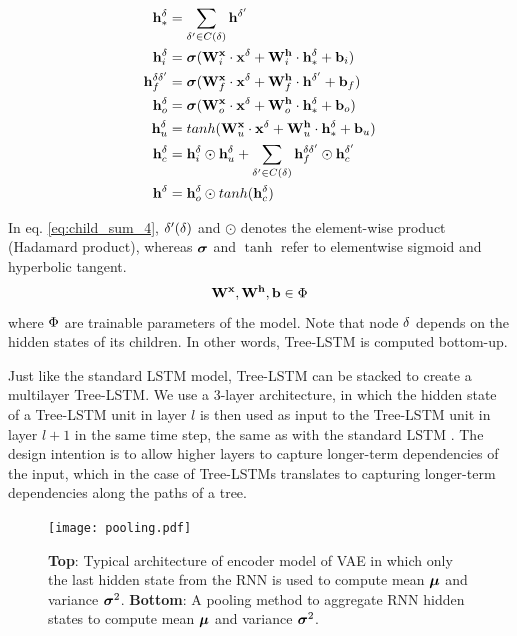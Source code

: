 \begin{align}\label{eq:tree_lstm_encoder}
    \mathbf{h}^\delta_{*} &= \sum_{\delta' \in C(\delta)} \mathbf{h}^{\delta'} \\
    \mathbf{h}_i^\delta &= \boldsymbol\sigma(\mathbf{W}^{\mathbf{x}}_{i} \cdot \mathbf{x}^\delta + \mathbf{W}^{\mathbf{h}}_{i} \cdot \mathbf{h}^\delta_* + \mathbf{b}_{i})  \\ 
    \mathbf{h}_f^{\delta \delta'} &= \boldsymbol\sigma(\mathbf{W}^{\mathbf{x}}_{f} \cdot \mathbf{x}^\delta + \mathbf{W}^{\mathbf{h}}_{f} \cdot \mathbf{h}^{\delta'} + \mathbf{b}_{f}) \\\label{eq:child_sum_4}
    \mathbf{h}_o^\delta &= \boldsymbol\sigma(\mathbf{W}^{\mathbf{x}}_{o} \cdot \mathbf{x}^\delta + \mathbf{W}^{\mathbf{h}}_{o} \cdot \mathbf{h}^\delta_* + \mathbf{b}_{o}) \\
    \mathbf{h}_u^\delta &= tanh(\mathbf{W}^{\mathbf{x}}_{u} \cdot \mathbf{x}^\delta + \mathbf{W}^{\mathbf{h}}_{u} \cdot \mathbf{h}^\delta_* + \mathbf{b}_{u}) \\
    \mathbf{h}_c^\delta &= \mathbf{h}_i^\delta \odot \mathbf{h}_u^\delta + \sum_{\delta' \in C(\delta)} \mathbf{h}_f^{\delta \delta'} \odot \mathbf{h}_c^{\delta'} \\
    \mathbf{h}^\delta &= \mathbf{h}_o^\delta \odot tanh(\mathbf{h}_c^\delta)
\end{align}

In eq. \ref{eq:child_sum_4}, $\delta'(\delta)$ and $\odot$ denotes the element-wise product (Hadamard product), whereas $\boldsymbol\sigma$ and $\tanh$ refer to elementwise sigmoid and hyperbolic tangent. 
\begin{equation}
    \mathbf{W}^{\mathbf{x}}, \mathbf{W}^{\mathbf{h}}, \mathbf{b} \in \Phi
\end{equation}
where $\Phi$ are trainable parameters of the model. 
Note that node $\delta$ depends on the hidden states of its children. 
In other words, Tree-LSTM is computed bottom-up. 

Just like the standard LSTM model, Tree-LSTM can be stacked to create a multilayer Tree-LSTM. 
We use a 3-layer architecture, in which the hidden state of a Tree-LSTM unit in layer $l$ is then used as input to the Tree-LSTM unit in layer $l + 1$ in the same time step, the same as with the standard LSTM \cite{graves2013hybrid}. 
The design intention is to allow higher layers to capture longer-term dependencies of the input, which in the case of Tree-LSTMs translates to capturing longer-term dependencies along the paths of a tree.

\begin{figure}
    \centering
    \texttt{[image: pooling.pdf]}
    \caption[RNN pooling]{\textbf{Top}: Typical architecture of encoder model of VAE in which only the last hidden state from the RNN is used to compute mean $\boldsymbol\mu$ and variance $\boldsymbol\sigma^2$. \textbf{Bottom}: A pooling method to aggregate RNN hidden states to compute mean $\boldsymbol\mu$ and variance $\boldsymbol\sigma^2$.}
    \label{fig:pooling}
\end{figure}




